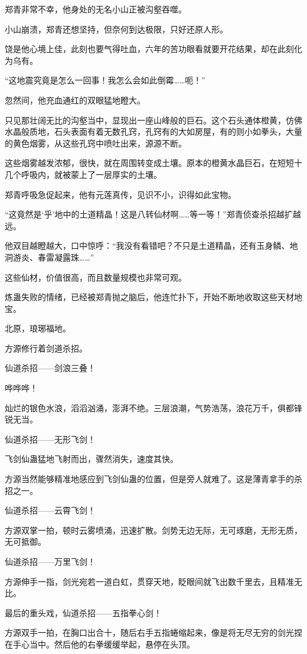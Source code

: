 \begin{this_body}
郑青非常不幸，他身处的无名小山正被沟壑吞噬。

小山崩溃，郑青还想坚持，但奈何到达极限，只好还原人形。

饶是他心境上佳，此刻也要气得吐血，六年的苦功眼看就要开花结果，却在此刻化为乌有。

“这地震究竟是怎么一回事！我怎么会如此倒霉……呃！”

忽然间，他充血通红的双眼猛地瞪大。

只见那壮阔无比的沟壑当中，显现出一座山峰般的巨石。这个石头通体橙黄，仿佛水晶般质地，石头表面有着无数孔窍，孔窍有的大如房屋，有的则小如拳头，大量的黄色烟雾，从这些孔窍中喷吐出来，源源不断。

这些烟雾越发浓郁，很快，就在周围转变成土壤。原本的橙黄水晶巨石，在短短十几个呼吸内，就被蒙上了一层厚实的土壤。

郑青呼吸急促起来，他有元莲真传，见识不小，识得如此宝物。

“这竟然是‘乎’地中的土道精晶！这是八转仙材啊……等一等！”郑青侦查杀招越扩越远。

他双目越瞪越大，口中惊呼：“我没有看错吧？不只是土道精晶，还有玉身鳞、地洞游炎、春雷凝露珠……”

这些仙材，价值很高，而且数量规模也非常可观。

炼蛊失败的情绪，已经被郑青抛之脑后，他连忙扑下，开始不断地收取这些天材地宝。

北原，琅琊福地。

方源修行着剑道杀招。

仙道杀招——剑浪三叠！

哗哗哗！

灿烂的银色水浪，滔滔汹涌，澎湃不绝。三层浪潮，气势浩荡，浪花万千，俱都锋锐无当。

仙道杀招——无形飞剑！

飞剑仙蛊猛地飞射而出，骤然消失，速度其快。

方源当然能够精准地感应到飞剑仙蛊的位置，但是旁人就难了。这是薄青拿手的杀招之一。

仙道杀招——云霄飞剑！

方源双掌一拍，顿时云雾喷涌，迅速扩散。剑势无边无际，无可琢磨，无形无质，无可抵御。

仙道杀招——万里飞剑！

方源伸手一指，剑光宛若一道白虹，贯穿天地，眨眼间就飞出数千里去，且精准无比。

最后的重头戏，仙道杀招——五指拳心剑！

方源双手一拍，在胸口出合十，随后右手五指蜷缩起来，像是将无尽无穷的剑光捏在手心当中。然后他的右拳缓缓举起，悬停在头顶。


\end{this_body}
